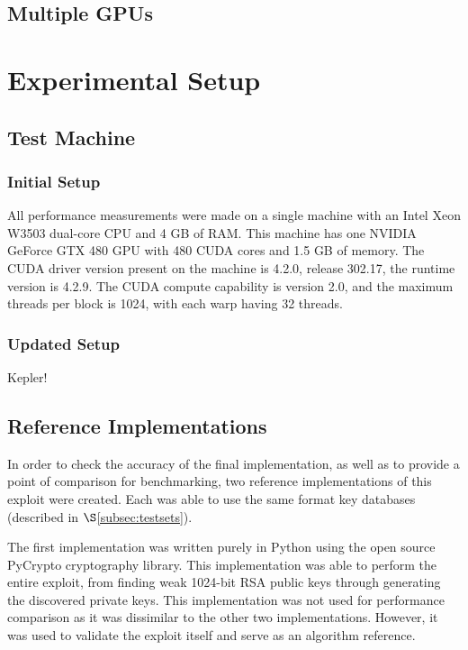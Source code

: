 \documentclass[smallextended]{svjour3}       %
\begin{document}
\subsection{Multiple GPUs}
\label{subsec:multiGPU}


\section{Experimental Setup}
\label{sec:expsetup}

\subsection{Test Machine}
\label{subsec:testmachine}

\subsubsection{Initial Setup}
\label{subsubsec:initsetup}
All performance measurements were made on a single machine with an Intel Xeon 
W3503 dual-core CPU and 4 GB of RAM. This machine has one NVIDIA GeForce
GTX 480 GPU with 480 CUDA cores and 1.5 GB of memory. The CUDA driver 
version present on the machine is 4.2.0, release 302.17, the runtime version is
4.2.9. The CUDA compute capability is version 2.0, and the maximum threads per 
block is 1024, with each warp having 32 threads.

\subsubsection{Updated Setup}
\label{subsubsec:updatedsetup}
Kepler!

\subsection{Reference Implementations}
\label{subsec:refimpl}
In order to check the accuracy of the final implementation, as well as to 
provide a point of comparison for benchmarking, two reference implementations 
of this exploit were created. Each was able to use the same format key 
databases (described in $\S$\ref{subsec:testsets}). 

The first implementation was written purely in Python using the open source
PyCrypto cryptography library. This implementation was able to perform the
entire exploit, from finding weak 1024-bit RSA public keys through generating
the discovered private keys. This implementation was not used for performance
comparison as it was dissimilar to the other two implementations. However, it
was used to validate the exploit itself and serve as an algorithm reference.
\end{document}

